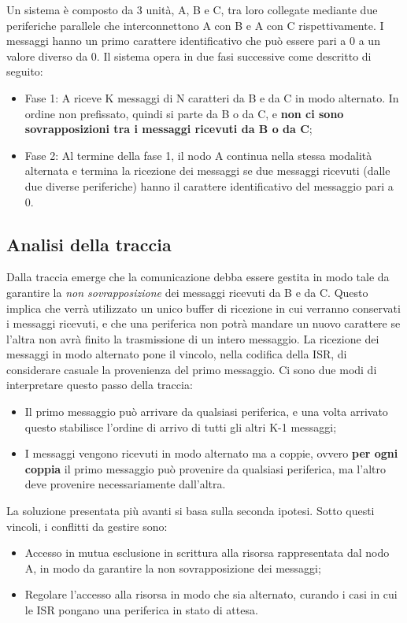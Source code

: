 \documentclass{article}
\begin{document}
Un sistema è composto da 3 unità, A, B e C, tra loro collegate mediante due periferiche parallele che interconnettono A con B e A con C rispettivamente. I messaggi hanno un primo carattere identificativo che può essere pari a 0 a un valore diverso da 0. Il sistema opera in due fasi successive come descritto di seguito:
\begin{itemize}
	\item Fase 1: A riceve K messaggi di N caratteri da B e da C in modo alternato. In ordine non prefissato, quindi si parte da B o da C, e \textbf{non ci sono sovrapposizioni tra i messaggi ricevuti da B o da C};
	\item Fase 2: Al termine della fase 1, il nodo A continua nella stessa modalità alternata e termina la ricezione dei messaggi se due messaggi ricevuti (dalle due diverse periferiche) hanno il carattere identificativo del messaggio pari a 0.
\end{itemize}


\subsection{Analisi della traccia}
Dalla traccia emerge che la comunicazione debba essere gestita in modo tale da garantire la \textit{non sovrapposizione} dei messaggi ricevuti da B e da C. Questo implica che verrà utilizzato un unico buffer di ricezione in cui verranno conservati i messaggi ricevuti, e che una periferica non potrà mandare un nuovo carattere se l'altra non avrà finito la trasmissione di un intero messaggio. La ricezione dei messaggi in modo alternato pone il vincolo, nella codifica della ISR, di considerare casuale la provenienza del primo messaggio. Ci sono due modi di interpretare questo passo della traccia:
\begin{itemize}
	\item Il primo messaggio può arrivare da qualsiasi periferica, e una volta arrivato questo stabilisce l'ordine di arrivo di tutti gli altri K-1 messaggi;
	\item I messaggi vengono ricevuti in modo alternato ma a coppie, ovvero \textbf{per ogni coppia} il primo messaggio può provenire da qualsiasi periferica, ma l'altro deve provenire necessariamente dall'altra.
\end{itemize}
La soluzione presentata più avanti si basa sulla seconda ipotesi. Sotto questi vincoli, i conflitti da gestire sono:
\begin{itemize}
	\item Accesso in mutua esclusione in scrittura alla risorsa rappresentata dal nodo A, in modo da garantire la non sovrapposizione dei messaggi;
	\item Regolare l'accesso alla risorsa in modo che sia alternato, curando i casi in cui le ISR pongano una periferica in stato di attesa. 
\end{itemize}
\end{document}
